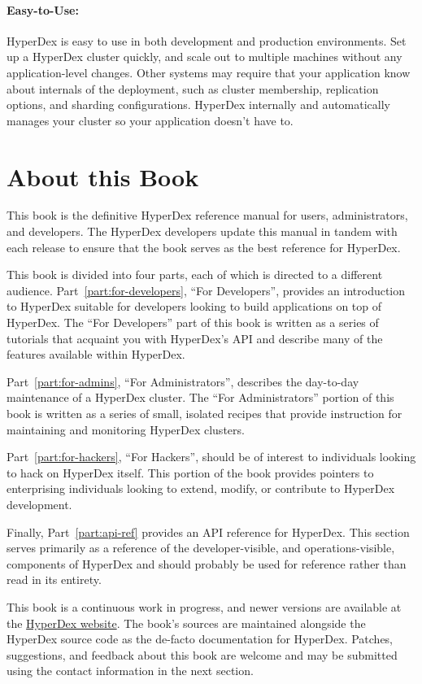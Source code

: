 \paragraph{Easy-to-Use:}  HyperDex is easy to use in both development and
production environments.  Set up a HyperDex cluster quickly, and scale out to
multiple machines without any application-level changes.  Other systems may
require that your application know about internals of the deployment, such as
cluster membership, replication options, and sharding configurations.  HyperDex
internally and automatically manages your cluster so your application doesn't
have to.

\section{About this Book}

This book is the definitive HyperDex reference manual for users, administrators,
and developers.  The HyperDex developers update this manual in tandem with each
release to ensure that the book serves as the best reference for HyperDex.

This book is divided into four parts, each of which is directed to a different
audience.  Part~\ref{part:for-developers}, ``For Developers'', provides an
introduction to HyperDex suitable for developers looking to build applications
on top of HyperDex.  The ``For Developers'' part of this book is written as a
series of tutorials that acquaint you with HyperDex's API and describe many of
the features available within HyperDex.

Part~\ref{part:for-admins}, ``For Administrators'', describes the day-to-day
maintenance of a HyperDex cluster.  The ``For Administrators'' portion of this
book is written as a series of small, isolated recipes that provide instruction
for maintaining and monitoring HyperDex clusters.

Part~\ref{part:for-hackers}, ``For Hackers'', should be of interest to
individuals looking to hack on HyperDex itself.  This portion of the book
provides pointers to enterprising individuals looking to extend, modify, or
contribute to HyperDex development.

Finally, Part~\ref{part:api-ref} provides an API reference for HyperDex.  This
section serves primarily as a reference of the developer-visible, and
operations-visible, components of HyperDex and should probably be used for
reference rather than read in its entirety.

This book is a continuous work in progress, and newer versions are available at
the \href{http://hyperdex.org/}{HyperDex website}.  The book's sources are
maintained alongside the HyperDex source code as the de-facto documentation for
HyperDex.  Patches, suggestions, and feedback about this book are welcome and
may be submitted using the contact information in the next section.

